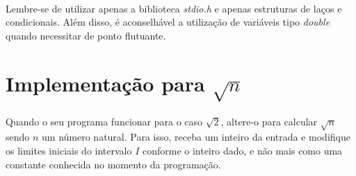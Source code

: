 \documentclass{article}
\begin{document}
            \paragraph{}
            Lembre-se de utilizar apenas a biblioteca \textit{stdio.h} e apenas estruturas de laços e condicionais. Além disso,
            é aconselhável a utilização de variáveis tipo \textit{double} quando necessitar de ponto flutuante.


    \section{Implementação para $\sqrt{n}$}
        \paragraph{}
        Quando o seu programa funcionar para o caso $\sqrt{2}$, altere-o para calcular $\sqrt{n}$ sendo $n$ um número natural.
        Para isso, receba um inteiro da entrada e modifique os limites iniciais do intervalo $I$ conforme o inteiro dado, e não
        mais como uma constante conhecida no momento da programação.
\end{document}
